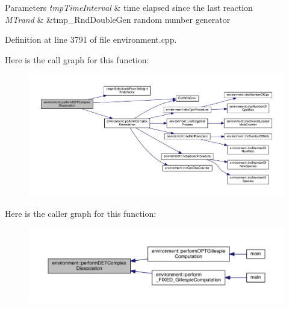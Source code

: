 \begin{DoxyParams}{Parameters}
{\em tmp\+Time\+Interval} & time elapsed since the last reaction \\
\hline
{\em M\+Trand} & \&tmp\+\_\+\+Rnd\+Double\+Gen random number generator \\
\hline
\end{DoxyParams}


Definition at line 3791 of file environment.\+cpp.



Here is the call graph for this function\+:\nopagebreak
\begin{figure}[H]
\begin{center}
\leavevmode
\includegraphics[width=350pt]{a00013_a6ae793f9d2dca0632239be955dd83cee_cgraph}
\end{center}
\end{figure}




Here is the caller graph for this function\+:\nopagebreak
\begin{figure}[H]
\begin{center}
\leavevmode
\includegraphics[width=350pt]{a00013_a6ae793f9d2dca0632239be955dd83cee_icgraph}
\end{center}
\end{figure}


